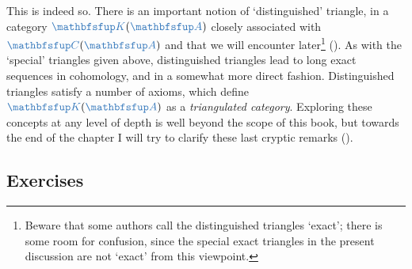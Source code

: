 This is indeed so. There is an important notion of `distinguished'
triangle, in a category $\categ{K}(\categ{A})$ closely associated with
$\categ{C}(\categ{A})$ and that we will encounter
later\footnote{Beware that some authors call the distinguished
  triangles `exact'; there is some room for confusion, since the
  special exact triangles in the present discussion are not `exact'
  from this viewpoint.}
(). As
with the `special' triangles given above, distinguished triangles lead
to long exact sequences in cohomology, and in a somewhat more direct
fashion. Distinguished triangles satisfy a number of axioms, which
define $\categ{K}(\categ{A})$ as a \emph{triangulated
  category}. Exploring these concepts at any level of depth is well
beyond the scope of this book, but towards the end of the chapter I
will try to clarify these last cryptic remarks
().

\subsection*{Exercises}

